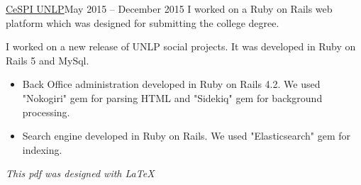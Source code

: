 \documentclass[9pt,a4paper]{altacv}
\begin{document}
\divider

 {\href{http://www.cespi.unlp.edu.ar/}{CeSPI UNLP}}{May 2015 -- December 2015}{}
I worked on a Ruby on Rails  web platform which was designed for submitting the college degree.

\divider

I worked on a new release of UNLP social projects. It was developed in Ruby on Rails 5 and MySql.

\divider

\begin{itemize}
    \item Back Office administration developed in Ruby on Rails 4.2. We used "Nokogiri" gem for parsing HTML and "Sidekiq" gem for background processing.
    \item Search engine developed in Ruby on Rails. We used "Elasticsearch" gem for indexing.
\end{itemize}


\textit{This pdf was designed with \LaTeX}
\end{document}
